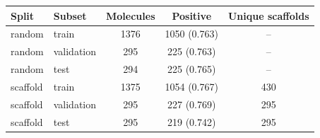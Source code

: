 \begin{tabular}{llccc}
\toprule
Split & Subset & Molecules & Positive & Unique scaffolds \\
\midrule
random & train & 1376 & 1050 (0.763) & -- \\
random & validation & 295 & 225 (0.763) & -- \\
random & test & 294 & 225 (0.765) & -- \\
scaffold & train & 1375 & 1054 (0.767) & 430 \\
scaffold & validation & 295 & 227 (0.769) & 295 \\
scaffold & test & 295 & 219 (0.742) & 295 \\
\bottomrule
\end{tabular}
